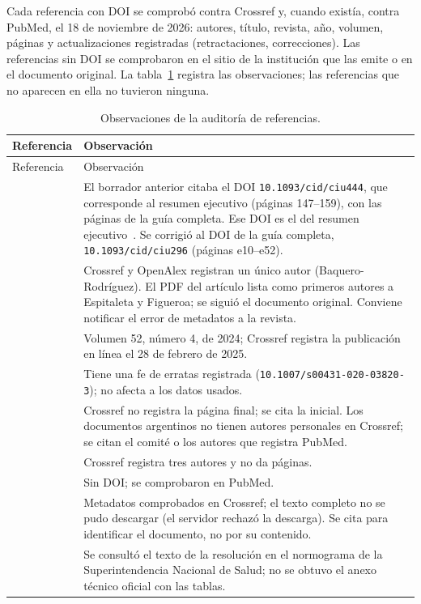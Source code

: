 \documentclass[11pt,a4paper]{article}
\newcommand{\codigo}[1]{\texttt{\small #1}}
\begin{document}
Cada referencia con DOI se comprobó contra Crossref y, cuando existía, contra PubMed, el 18 de noviembre de 2026: autores, título, revista, año, volumen, páginas y actualizaciones registradas (retractaciones, correcciones). Las referencias sin DOI se comprobaron en el sitio de la institución que las emite o en el documento original. La tabla~\ref{tab:auditoria} registra las observaciones; las referencias que no aparecen en ella no tuvieron ninguna.

\begin{longtable}{@{}>{\raggedright\arraybackslash}p{2.6cm}p{13.1cm}@{}}
\caption{Observaciones de la auditoría de referencias.}\label{tab:auditoria}\\
\toprule
Referencia & Observación \\
\midrule
\endfirsthead
\toprule
Referencia & Observación \\
\midrule
\endhead
\bottomrule
\endfoot
\citep{stevens2014} & El borrador anterior citaba el DOI \codigo{10.1093/cid/ciu444}, que corresponde al resumen ejecutivo (páginas 147--159), con las páginas de la guía completa. Ese DOI es el del resumen ejecutivo~\citep{stevens2014resumen}. Se corrigió al DOI de la guía completa, \codigo{10.1093/cid/ciu296} (páginas e10--e52). \\
\citep{itucol2023} & Crossref y OpenAlex registran un único autor (Baquero-Rodríguez). El PDF del artículo lista como primeros autores a Espitaleta y Figueroa; se siguió el documento original. Conviene notificar el error de metadatos a la revista. \\
\citep{acorloma2024,acorlfaa2024,acorlrs2024} & Volumen 52, número 4, de 2024; Crossref registra la publicación en línea el 28 de febrero de 2025. \\
\citep{buettcher2021} & Tiene una fe de erratas registrada (\codigo{10.1007/s00431-020-03820-3}); no afecta a los datos usados. \\
\citep{mexicooma2022,sapiras2021,sapitu2022,sapfiebre2017,sappiel2014,sappiel2014a} & Crossref no registra la página final; se cita la inicial. Los documentos argentinos no tienen autores personales en Crossref; se citan el comité o los autores que registra PubMed. \\
\citep{sadi2024} & Crossref registra tres autores y no da páginas. \\
\citep{gaddey2019,sakulchit2017} & Sin DOI; se comprobaron en PubMed. \\
\citep{florez2015} & Metadatos comprobados en Crossref; el texto completo no se pudo descargar (el servidor rechazó la descarga). Se cita para identificar el documento, no por su contenido. \\
\citep{res2465} & Se consultó el texto de la resolución en el normograma de la Superintendencia Nacional de Salud; no se obtuvo el anexo técnico oficial con las tablas. \\
\end{longtable}
\end{document}
